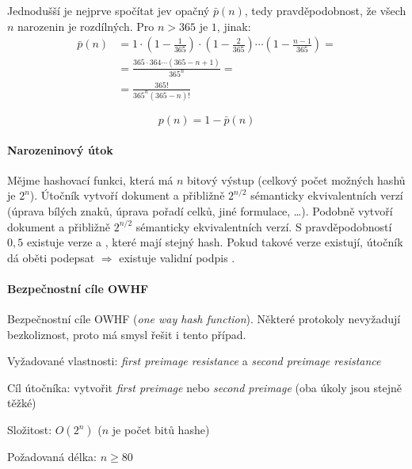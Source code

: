 Jednodušší je nejprve spočítat jev opačný $\bar p(n)$, tedy pravděpodobnost, že všech $n$ narozenin je rozdílných. Pro $n > 365$ je $1$, jinak:
\begin{equation}
\begin{aligned}
\bar p(n) &= 1 \cdot \left(1-\frac{1}{365}\right) \cdot \left(1-\frac{2}{365}\right) \cdots \left(1-\frac{n-1}{365}\right) = \\
&=  \frac{365 \cdot 364 \cdots (365-n+1)}{365^n} = \\
&=  \frac{365!}{365^n (365-n)!}
\end{aligned}
\end{equation}

\begin{equation}
    p(n) = 1 - \bar p(n)
\end{equation}

\paragraph*{Narozeninový útok} Mějme hashovací funkci, která má $n$ bitový výstup (celkový počet možných hashů je $2^{n}$). Útočník vytvoří dokument  a přibližně $2^{n/2}$ sémanticky ekvivalentních verzí (úprava bílých znaků, úprava pořadí celků, jiné formulace, \dots). Podobně vytvoří dokument  a přibližně $2^{n/2}$ sémanticky ekvivalentních verzí. S pravděpodobností $0,5$ existuje verze  a , které mají stejný hash. Pokud takové verze existují, útočník dá oběti podepsat  $\Rightarrow$ existuje validní podpis .

\paragraph*{Bezpečnostní cíle OWHF} Bezpečnostní cíle OWHF (\textit{one way hash function}). Některé protokoly nevyžadují bezkoliznost, proto má smysl řešit i tento případ. \begin{compactitem}
    \item Vyžadované vlastnosti: \textit{first preimage resistance} a \textit{second preimage resistance}
    \item Cíl útočníka: vytvořit \textit{first preimage} nebo \textit{second preimage} (oba úkoly jsou stejně těžké)
    \item Složitost: $O(2^n)$ ($n$ je počet bitů hashe)
    \item Požadovaná délka: $n \geq 80$
\end{compactitem}

